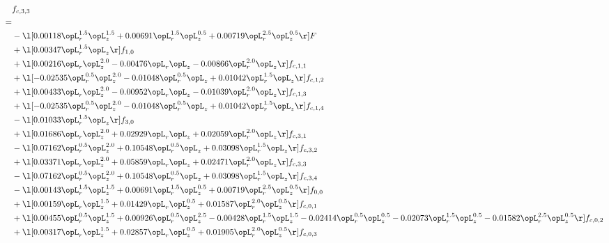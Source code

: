 \begin{alignat}{2} 
\label{eq:f_33_1} 
& f_{c,3,3} \nonumber \\ 
 = \\ 
& - \l[  0.00118 \opL_r^{1.5} \opL_z^{1.5} +  0.00691 \opL_r^{1.5} \opL_z^{0.5} +  0.00719 \opL_r^{2.5} \opL_z^{0.5}  \r] F \nonumber \\ 
& + \l[  0.00347 \opL_r^{1.5} \opL_z  \r] f_{1,0} \nonumber \\ 
& + \l[  0.00216 \opL_r \opL_z^{2.0}   -0.00476 \opL_r \opL_z   -0.00866 \opL_r^{2.0} \opL_z  \r] f_{c,1,1} \nonumber \\ 
& + \l[  -0.02535 \opL_r^{0.5} \opL_z^{2.0}   -0.01048 \opL_r^{0.5} \opL_z +  0.01042 \opL_r^{1.5} \opL_z  \r] f_{c,1,2} \nonumber \\ 
& + \l[  0.00433 \opL_r \opL_z^{2.0}   -0.00952 \opL_r \opL_z   -0.01039 \opL_r^{2.0} \opL_z  \r] f_{c,1,3} \nonumber \\ 
& + \l[  -0.02535 \opL_r^{0.5} \opL_z^{2.0}   -0.01048 \opL_r^{0.5} \opL_z +  0.01042 \opL_r^{1.5} \opL_z  \r] f_{c,1,4} \nonumber \\ 
& - \l[  0.01033 \opL_r^{1.5} \opL_z  \r] f_{3,0} \nonumber \\ 
& + \l[  0.01686 \opL_r \opL_z^{2.0} +  0.02929 \opL_r \opL_z +  0.02059 \opL_r^{2.0} \opL_z  \r] f_{c,3,1} \nonumber \\ 
& - \l[  0.07162 \opL_r^{0.5} \opL_z^{2.0} +  0.10548 \opL_r^{0.5} \opL_z +  0.03098 \opL_r^{1.5} \opL_z  \r] f_{c,3,2} \nonumber \\ 
& + \l[  0.03371 \opL_r \opL_z^{2.0} +  0.05859 \opL_r \opL_z +  0.02471 \opL_r^{2.0} \opL_z  \r] f_{c,3,3} \nonumber \\ 
& - \l[  0.07162 \opL_r^{0.5} \opL_z^{2.0} +  0.10548 \opL_r^{0.5} \opL_z +  0.03098 \opL_r^{1.5} \opL_z  \r] f_{c,3,4} \nonumber \\ 
& - \l[  0.00143 \opL_r^{1.5} \opL_z^{1.5} +  0.00691 \opL_r^{1.5} \opL_z^{0.5} +  0.00719 \opL_r^{2.5} \opL_z^{0.5}  \r] f_{0,0} \nonumber \\ 
& + \l[  0.00159 \opL_r \opL_z^{1.5} +  0.01429 \opL_r \opL_z^{0.5} +  0.01587 \opL_r^{2.0} \opL_z^{0.5}  \r] f_{c,0,1} \nonumber \\ 
& + \l[  0.00455 \opL_r^{0.5} \opL_z^{1.5} +  0.00926 \opL_r^{0.5} \opL_z^{2.5}   -0.00428 \opL_r^{1.5} \opL_z^{1.5}   -0.02414 \opL_r^{0.5} \opL_z^{0.5}   -0.02073 \opL_r^{1.5} \opL_z^{0.5}   -0.01582 \opL_r^{2.5} \opL_z^{0.5}  \r] f_{c,0,2} \nonumber \\ 
& + \l[  0.00317 \opL_r \opL_z^{1.5} +  0.02857 \opL_r \opL_z^{0.5} +  0.01905 \opL_r^{2.0} \opL_z^{0.5}  \r] f_{c,0,3} \nonumber \\ 

\end{alignat}
